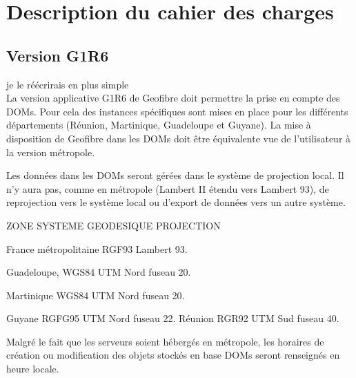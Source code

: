 \chapter{Description du cahier des charges}
\section{Version G1R6}
je le réécrirais en plus simple\\
La version applicative G1R6 de Geofibre doit permettre la prise en compte des DOMs. Pour cela des instances spécifiques sont mises en place  pour les différents départements (Réunion, Martinique, Guadeloupe et Guyane).
La mise à disposition de Geofibre dans les DOMs doit être équivalente vue de l’utilisateur à la version métropole.

Les données dans les DOMs seront gérées dans le système de projection local. Il n’y aura pas, comme en métropole (Lambert II étendu vers Lambert 93), de reprojection vers le système local ou d’export de données vers un autre système.

ZONE
 	SYSTEME GEODESIQUE 	PROJECTION

France métropolitaine 	RGF93
 	Lambert 93.

Guadeloupe, 	WGS84
 	UTM Nord fuseau 20.

Martinique 	WGS84
 	UTM Nord fuseau 20.

Guyane 	RGFG95 	UTM Nord fuseau 22.
Réunion 	RGR92 	UTM Sud fuseau 40.


Malgré le fait que les serveurs soient hébergés en métropole, les horaires de création ou modification des objets stockés en base DOMs seront renseignés en heure locale.

